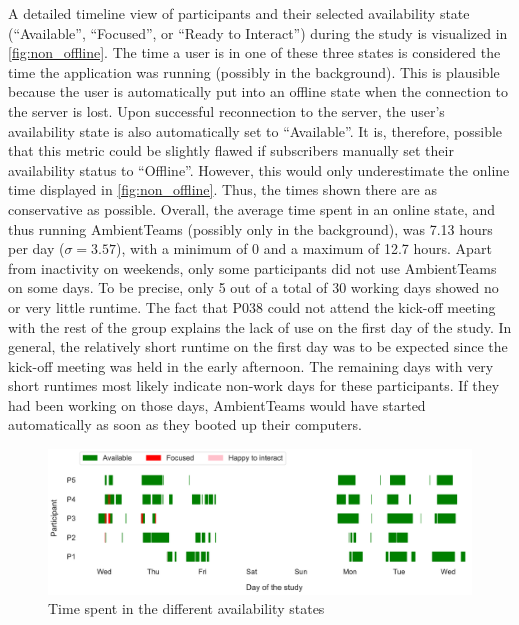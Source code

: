 A detailed timeline view of participants and their selected availability state (\enquote{Available}, \enquote{Focused}, or \enquote{Ready to Interact}) during the study is visualized in \autoref{fig:non_offline}. The time a user is in one of these three states is considered the time the application was running (possibly in the background). This is plausible because the user is automatically put into an offline state when the connection to the server is lost. Upon successful reconnection to the server, the user's availability state is also automatically set to \enquote{Available}. It is, therefore, possible that this metric could be slightly flawed if subscribers manually set their availability status to \enquote{Offline}. However, this would only underestimate the online time displayed in \autoref{fig:non_offline}. Thus, the times shown there are as conservative as possible. Overall, the average time spent in an online state, and thus running AmbientTeams (possibly only in the background), was 7.13 hours per day ($\sigma=3.57$), with a minimum of 0 and a maximum of 12.7 hours. Apart from inactivity on weekends, only some participants did not use AmbientTeams on some days. To be precise, only 5 out of a total of 30 working days showed no or very little runtime. The fact that P038 could not attend the kick-off meeting with the rest of the group explains the lack of use on the first day of the study. In general, the relatively short runtime on the first day was to be expected since the kick-off meeting was held in the early afternoon. The remaining days with very short runtimes most likely indicate non-work days for these participants. If they had been working on those days, AmbientTeams would have started automatically as soon as they booted up their computers.

\begin{figure}[h]
    \centering
    \includegraphics[width=\linewidth]{plots/non_offline.pdf}
    \caption{Time spent in the different availability states}
    \label{fig:non_offline}
\end{figure}

